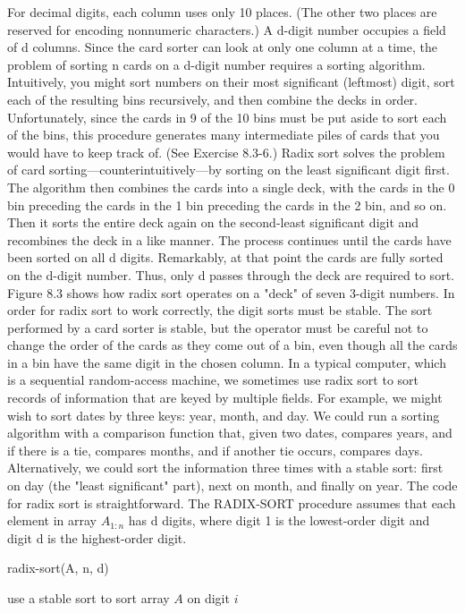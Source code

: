 For decimal digits, each column uses only 10 places. (The other two places are reserved for encoding nonnumeric characters.) A d-digit number occupies a field of d columns. Since the card sorter can look at only one column at a time, the problem of sorting n cards on a d-digit number requires a sorting algorithm.
Intuitively, you might sort numbers on their most significant (leftmost) digit, sort each of the resulting bins recursively, and then combine the decks in order. Unfortunately, since the cards in 9 of the 10 bins must be put aside to sort each of the bins, this procedure generates many intermediate piles of cards that you would have to keep track of. (See Exercise 8.3-6.)
Radix sort solves the problem of card sorting—counterintuitively—by sorting on the least significant digit first. The algorithm then combines the cards into a single deck, with the cards in the 0 bin preceding the cards in the 1 bin preceding the cards in the 2 bin, and so on. Then it sorts the entire deck again on the second-least significant digit and recombines the deck in a like manner. The process continues until the cards have been sorted on all d digits. Remarkably, at that point the cards are fully sorted on the d-digit number. Thus, only d passes through the deck are required to sort. Figure 8.3 shows how radix sort operates on a "deck" of seven 3-digit numbers.
In order for radix sort to work correctly, the digit sorts must be stable. The sort performed by a card sorter is stable, but the operator must be careful not to change the order of the cards as they come out of a bin, even though all the cards in a bin have the same digit in the chosen column.
In a typical computer, which is a sequential random-access machine, we sometimes use radix sort to sort records of information that are keyed by multiple fields. For example, we might wish to sort dates by three keys: year, month, and day. We could run a sorting algorithm with a comparison function that, given two dates, compares years, and if there is a tie, compares months, and if another tie occurs, compares days. Alternatively, we could sort the information three times with a stable sort: first on day (the "least significant" part), next on month, and finally on year.
The code for radix sort is straightforward. The RADIX-SORT procedure assumes that each element in array $A_{1 : n}$ has d digits, where digit 1 is the lowest-order digit and digit d is the highest-order digit.


\begin{algbox}{radix-sort(A, n, d)}
  \begin{algorithm}[H]
     {
        use a stable sort to sort array $A$ on digit $i$
    }
  \end{algorithm}
\end{algbox}

